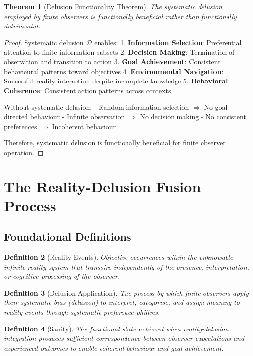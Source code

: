 \documentclass[12pt,a4paper]{article}
\newtheorem{theorem}{Theorem}[section]
\newtheorem{definition}[theorem]{Definition}
\begin{document}
\begin{theorem}[Delusion Functionality Theorem]
The systematic delusion employed by finite observers is functionally beneficial rather than functionally detrimental.
\end{theorem}

\begin{proof}
Systematic delusion $\mathcal{D}$ enables:
1. \textbf{Information Selection}: Preferential attention to finite information subsets
2. \textbf{Decision Making}: Termination of observation and transition to action
3. \textbf{Goal Achievement}: Consistent behavioural patterns toward objectives
4. \textbf{Environmental Navigation}: Successful reality interaction despite incomplete knowledge
5. \textbf{Behavioral Coherence}: Consistent action patterns across contexts

Without systematic delusion:
- Random information selection $\Rightarrow$ No goal-directed behaviour
- Infinite observation $\Rightarrow$ No decision making
- No consistent preferences $\Rightarrow$ Incoherent behaviour

Therefore, systematic delusion is functionally beneficial for finite observer operation.
\end{proof}

\section{The Reality-Delusion Fusion Process}

\subsection{Foundational Definitions}

\begin{definition}[Reality Events]
Objective occurrences within the unknowable-infinite reality system that transpire independently of the presence, interpretation, or cognitive processing of the observer.
\end{definition}

\begin{definition}[Delusion Application]
The process by which finite observers apply their systematic bias (delusion) to interpret, categorise, and assign meaning to reality events through systematic preference philtres.
\end{definition}

\begin{definition}[Sanity]
The functional state achieved when reality-delusion integration produces sufficient correspondence between observer expectations and experienced outcomes to enable coherent behaviour and goal achievement.
\end{definition}
\end{document}
